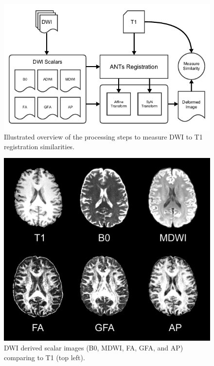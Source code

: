\begin{figure}[H]
\includegraphics[width=\linewidth]{figure1}
\caption{Illustrated overview of the processing steps to measure DWI to T1 registration similarities.}
\centering
\label{fig:APfigure1}
\end{figure}

 \begin{figure}[H]
 \includegraphics[width=\linewidth]{figure2}
 \caption{DWI derived scalar images (B0, MDWI, FA, GFA, and AP) comparing to T1 (top left).}
 \centering
 \label{fig:APfigure2}
 \end{figure}

